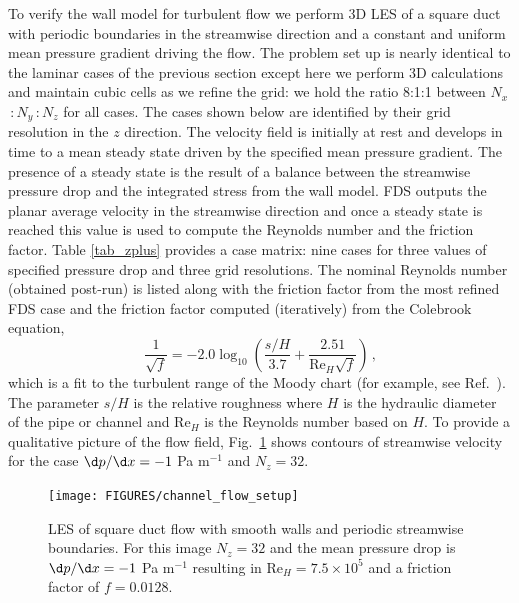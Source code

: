 \documentclass[11pt]{book}
\begin{document}
To verify the wall model for turbulent flow we perform 3D LES of a square duct with periodic boundaries in the streamwise direction and a constant and uniform mean pressure gradient driving the flow.  The problem set up is nearly identical to the laminar cases of the previous section except here we perform 3D calculations and maintain cubic cells as we refine the grid: we hold the ratio 8:1:1 between $N_x$\,:\,$N_y$\,:\,$N_z$ for all cases.  The cases shown below are identified by their grid resolution in the $z$ direction.  The velocity field is initially at rest and develops in time to a mean steady state driven by the specified mean pressure gradient.  The presence of a steady state is the result of a balance between the streamwise pressure drop and the integrated stress from the wall model.  FDS outputs the planar average velocity in the streamwise direction and once a steady state is reached this value is used to compute the Reynolds number and the friction factor.  Table \ref{tab_zplus} provides a case matrix: nine cases for three values of specified pressure drop and three grid resolutions.  The nominal Reynolds number (obtained post-run) is listed along with the friction factor from the most refined FDS case and the friction factor computed (iteratively) from the Colebrook equation,
\begin{equation}
\label{eqn_colebrook}
\frac{1}{\sqrt{f}} = -2.0 \log_{10} \left( \frac{s/H}{3.7} + \frac{2.51}{\mbox{Re}_H\sqrt{f}} \right) \,\mbox{,}
\end{equation}
which is a fit to the turbulent range of the Moody chart (for example, see Ref.~\cite{MYO}).  The parameter $s/H$ is the relative
roughness where $H$ is the hydraulic diameter of the pipe or channel and Re$_H$ is the Reynolds number based on $H$.
To provide a qualitative picture of the flow field, Fig.~\ref{fig_channel_flow_setup} shows contours of streamwise velocity
for the case $\d p/\d x = -1$ Pa m$^{-1}$ and $N_z=32$.

\begin{figure}
\centering
\texttt{[image: FIGURES/channel\_flow\_setup]}
\caption[LES of square duct flow]{LES of square duct flow with smooth walls and periodic streamwise boundaries.  For this image $N_z=32$ and the mean pressure drop is $\d p/ \d x = -1$ Pa m$^{-1}$ resulting in Re$_H = 7.5\times 10^5$ and a friction factor of $f=0.0128$.}
\label{fig_channel_flow_setup}
\end{figure}
\end{document}
